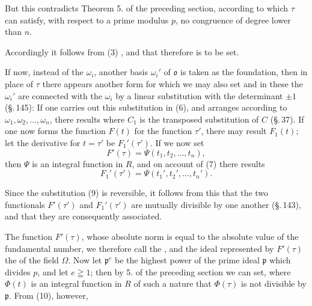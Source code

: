 
But this contradicts Theorem 5. of the preceding section, according to which $\tau$ can satisfy, with respect to a prime modulus $p$, no congruence of degree lower than $n$.

Accordingly it follows from (3) , and that therefore
is to be set.

If now, instead of the $\omega_i$, another basis $\omega_i'$ of $\mathfrak{o}$ is taken as the foundation, then in place of $\tau$ there appears another form
for which we may also set
and in these the $\omega_i'$ are connected with the $\omega_i$ by a linear substitution with the determinant $\pm 1$ (\S.\,145):
If one carries out this substitution in (6), and arranges according to $\omega_1, \omega_2, \ldots, \omega_n$, there results
where $C_1$ is the transposed substitution of $C$ (\S.\,37). If one now forms the function $F(t)$ for the function $\tau'$, there may result $F_1(t)$; let the derivative for $t=\tau'$ be $F_1'(\tau')$. If we now set
\[
F'(\tau) = \Psi(t_1, t_2, \ldots, t_n),
\]
then $\Psi$ is an integral function in $R$, and on account of (7) there results
\[
F_1'(\tau') = \Psi(t_1', t_2', \ldots, t_n').
\]

Since the substitution (9) is reversible, it follows from this that the two functionals $F'(\tau')$ and $F_1'(\tau')$ are mutually divisible by one another (\S.\,143), and that they are consequently associated.

The function $F'(\tau)$, whose absolute norm is equal to the absolute value of the fundamental number, we therefore call the , and the ideal represented by $F'(\tau)$ the  of the field $\Omega$. Now let $\mathfrak{p}^e$ be the highest power of the prime ideal $\mathfrak{p}$ which divides $p$, and let $e \geqq 1$; then by 5. of the preceding section we can
set, where $\Phi(t)$ is an integral function in $R$ of such a nature that $\Phi(\tau)$ is not divisible by $\mathfrak{p}$. From (10), however,
